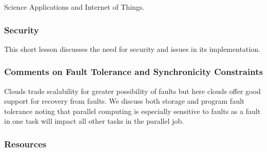 Science Applications and Internet of Things.


\subsubsection{Security}\label{security}

This short lesson discusses the need for security and issues in its
implementation.



\subsubsection{Comments on Fault Tolerance and Synchronicity Constraints}\label{comments-on-fault-tolerance-and-synchronicity-constraints}

Clouds trade scalability for greater possibility of faults but here
clouds offer good support for recovery from faults. We discuss both
storage and program fault tolerance noting that parallel computing is
especially sensitive to faults as a fault in one task will impact all
other tasks in the parallel job.


\subsubsection{Resources}\label{resources-3}

